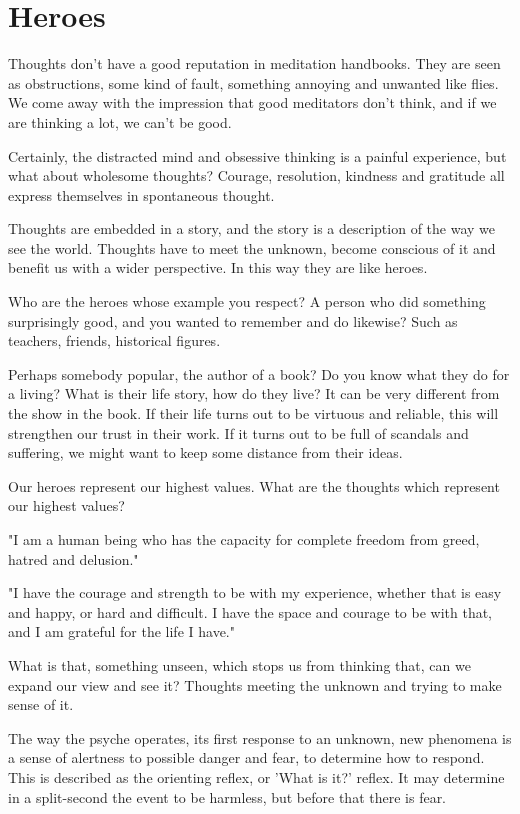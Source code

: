 \hypertarget{heroes-1}{%
\chapter{Heroes}\label{heroes-1}}

Thoughts don't have a good reputation in meditation handbooks. They are
seen as obstructions, some kind of fault, something annoying and
unwanted like flies. We come away with the impression that good
meditators don't think, and if we are thinking a lot, we can't be good.

Certainly, the distracted mind and obsessive thinking is a painful
experience, but what about wholesome thoughts? Courage, resolution,
kindness and gratitude all express themselves in spontaneous thought.

Thoughts are embedded in a story, and the story is a description of the
way we see the world. Thoughts have to meet the unknown, become
conscious of it and benefit us with a wider perspective. In this way
they are like heroes.

Who are the heroes whose example you respect? A person who did something
surprisingly good, and you wanted to remember and do likewise? Such as
teachers, friends, historical figures.

Perhaps somebody popular, the author of a book? Do you know what they do
for a living? What is their life story, how do they live? It can be very
different from the show in the book. If their life turns out to be
virtuous and reliable, this will strengthen our trust in their work. If
it turns out to be full of scandals and suffering, we might want to keep
some distance from their ideas.

Our heroes represent our highest values. What are the thoughts which
represent our highest values?

"I am a human being who has the capacity for complete freedom from
greed, hatred and delusion."

"I have the courage and strength to be with my experience, whether that
is easy and happy, or hard and difficult. I have the space and courage
to be with that, and I am grateful for the life I have."

What is that, something unseen, which stops us from thinking that, can
we expand our view and see it? Thoughts meeting the unknown and trying
to make sense of it.

The way the psyche operates, its first response to an unknown, new
phenomena is a sense of alertness to possible danger and fear, to
determine how to respond. This is described as the orienting reflex, or
'What is it?' reflex. It may determine in a split-second the event to be
harmless, but before that there is fear.

